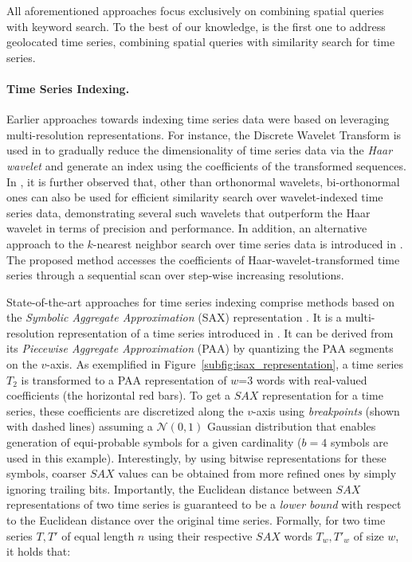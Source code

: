 All aforementioned approaches focus exclusively on combining spatial queries with keyword search. To the best of our knowledge, \btsr is the first one to address geolocated time series, combining spatial queries with similarity search for time series.

\paragraph{Time Series Indexing.} Earlier approaches towards indexing time series data were based on leveraging multi-resolution representations. For instance, the Discrete Wavelet Transform \cite{graps1995cse} is used in \cite{chan1999icde} to gradually reduce the dimensionality of time series data via the \emph{Haar wavelet} \cite{haar1910theorie} and generate an index using the coefficients of the transformed sequences. In \cite{popivanov2002icde}, it is further observed that, other than orthonormal wavelets, bi-orthonormal ones can also be used for efficient similarity search over wavelet-indexed time series data, demonstrating several such wavelets that outperform the Haar wavelet in terms of precision and performance. In addition, an alternative approach to the $k$-nearest neighbor search over time series data is introduced in \cite{kashyap2011kdd}. The proposed method accesses the coefficients of Haar-wavelet-transformed time series through a sequential scan over step-wise increasing resolutions.

State-of-the-art approaches for time series indexing comprise methods based on the {\em Symbolic Aggregate Approximation} (SAX) representation \cite{jessica2007dmkd}. It is a multi-resolution representation of a time series introduced in \cite{shieh2008kdd}. It can be derived from its {\em Piecewise Aggregate Approximation} (PAA) \cite{keogh2001paa,faloutsos2000vldb} by quantizing the PAA segments on the $v$-axis. As exemplified in Figure~\ref{subfig:isax_representation}, a time series $T_2$ is transformed to a PAA representation of $w$=3 words with real-valued coefficients (the horizontal red bars). To get a $SAX$ representation for a time series, these coefficients are discretized along the $v$-axis using {\em breakpoints} (shown with dashed lines) assuming a $\mathcal{N}(0,1)$ Gaussian distribution that enables generation of equi-probable symbols for a given cardinality ($b=4$ symbols are used in this example). Interestingly, by using bitwise representations for these symbols, coarser $SAX$ values can be obtained from more refined ones by simply ignoring trailing bits. Importantly, the Euclidean distance between $SAX$ representations of two time series is guaranteed to be a {\em lower bound} with respect to the Euclidean distance over the original time series. Formally, for two time series $T, T'$ of equal length $n$ using their respective $SAX$ words $T_w, T'_w$ of size $w$, it holds that:

